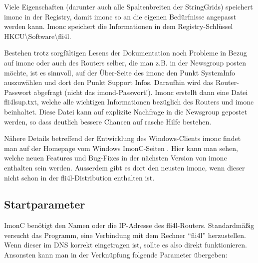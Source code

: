   Viele Eigenschaften (darunter auch alle Spaltenbreiten der StringGrids) 
  speichert imonc in der Registry, damit imonc so an die eigenen Bedürfnisse 
  angepasst werden kann. Imonc speichert die Informationen in dem 
  Registry-Schlüssel HKCU{\textbackslash}Software{\textbackslash}fli4l.

  Bestehen trotz sorgfältigen Lesens der Dokumentation noch Probleme in Bezug 
  auf imonc oder auch des Routers selber, die man z.B. in der Newsgroup posten 
  möchte, ist es sinnvoll, auf der Über-Seite des imonc den Punkt SystemInfo 
  auszuwählen und dort den Punkt Support Infos. Daraufhin wird das 
  Router-Passwort abgefragt (nicht das imond-Passwort!). Imonc erstellt dann 
  eine Datei fli4lsup.txt, welche alle wichtigen Informationen bezüglich des 
  Routers und imonc beinhaltet. Diese Datei kann auf explizite Nachfrage in die 
  Newsgroup gepostet werden, so dass deutlich bessere Chancen auf rasche Hilfe
  bestehen.

  Nähere Details betreffend der Entwicklung des Windows-Clients imonc findet man 
  auf der Homepage vom Windows ImonC-Seiten . Hier 
  kann man sehen, welche neuen Features und Bug-Fixes in der nächsten Version 
  von imonc enthalten sein werden. Ausserdem gibt es dort den neusten imonc, 
  wenn dieser nicht schon in der fli4l-Distribution enthalten ist.

  \subsection{Startparameter}

  ImonC benötigt den Namen oder die IP-Adresse des fli4l-Routers. Standardmäßig 
  versucht das Programm, eine Verbindung mit dem Rechner ``fli4l'' herzustellen. 
  Wenn dieser im DNS korrekt eingetragen ist, sollte es also direkt 
  funktionieren. Ansonsten kann man in der Verknüpfung folgende Parameter 
  übergeben:

